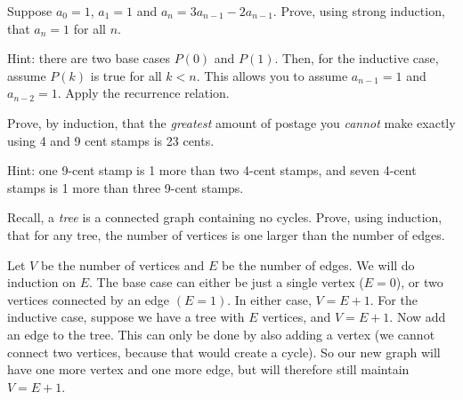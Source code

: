 \begin{squestions}
\question Suppose $a_0 = 1$, $a_1 = 1$ and $a_n = 3a_{n-1} - 2a_{n-1}$.  Prove, using strong induction, that $a_n = 1$ for all $n$.

	\begin{answer}
		Hint: there are two base cases $P(0)$ and $P(1)$.  Then, for the inductive case, assume $P(k)$ is true for all $k < n$.  This allows you to assume $a_{n-1} = 1$ and $a_{n-2} = 1$.  Apply the recurrence relation.
	\end{answer}




\question Prove, by induction, that the {\em greatest} amount of postage you {\em cannot} make exactly using 4 and 9 cent stamps is 23 cents.


  \begin{answer}
 Hint: one 9-cent stamp is 1 more than two 4-cent stamps, and seven 4-cent stamps is 1 more than three 9-cent stamps.
  \end{answer}



\question Recall, a {\em tree} is a connected graph containing no cycles.  Prove, using induction, that for any tree, the number of vertices is one larger than the number of edges.  

	\begin{answer}
		Let $V$ be the number of vertices and $E$ be the number of edges.  We will do induction on $E$. The base case can either be just a single vertex ($E=0$), or two vertices connected by an edge $(E=1)$.  In either case, $V = E+1$.  For the inductive case, suppose we have a tree with $E$ vertices, and $V = E+1$.  Now add an edge to the tree.  This can only be done by also adding a vertex (we cannot connect two vertices, because that would create a cycle).  So our new graph will have one more vertex and one more edge, but will therefore still maintain $V = E+1$.
	\end{answer}

	
\end{squestions}




